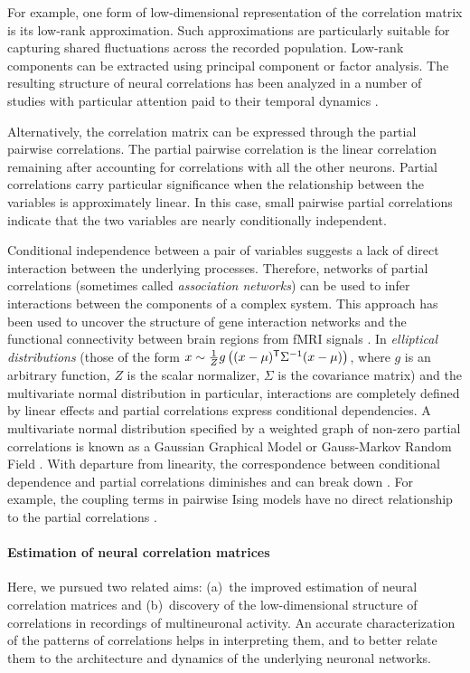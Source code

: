 \documentclass[10pt]{article}
\newcommand{\T}{{\sf T}}
\begin{document}
For example, one form of low-dimensional representation of the correlation matrix is its low-rank approximation. Such approximations are particularly suitable for capturing shared fluctuations across the recorded population. Low-rank components can be extracted using principal component or factor analysis. The resulting structure of  neural correlations has been analyzed in a number of studies with particular attention paid to their temporal dynamics \cite{Yu:2009}.

Alternatively, the correlation matrix can be expressed through the partial pairwise correlations. The partial pairwise correlation is the linear correlation remaining after accounting for correlations with all the other neurons. Partial correlations carry particular significance when the relationship between the variables is approximately linear. In this case, small pairwise partial correlations indicate that the two variables are nearly conditionally independent.  

Conditional independence between a pair of variables suggests a lack of direct interaction between the underlying processes. Therefore, networks of partial correlations (sometimes called \emph{association networks}) can be used to infer interactions between the components of a complex system.  This approach has been used to uncover the structure of gene interaction networks \cite{Schafer:2005,Peng:2009} and the functional connectivity between brain regions from fMRI signals \cite{Varoquaux:2012,Ryali:2012}. In \emph{elliptical distributions} (those of the form $x \sim \frac 1 Z g\left((x-\mu)^\T\Sigma^{-1}(x-\mu)\right)$, where $g$ is an arbitrary function, $Z$ is the scalar normalizer, $\Sigma$ is the covariance matrix) and the multivariate normal distribution in particular, interactions are completely defined by linear effects and partial correlations express conditional dependencies. A multivariate normal distribution specified by a weighted graph of non-zero partial correlations is known as a Gaussian Graphical Model or Gauss-Markov Random Field \cite{Koller:2009}. With departure from linearity, the correspondence between conditional dependence and partial correlations diminishes and can break down \cite{Loh:2012}. For example, the coupling terms in pairwise Ising models have no direct relationship to the partial correlations \cite{Schneidman:2006, Tkacik:2006}.


\paragraph{Estimation of neural correlation matrices}
Here, we pursued two related aims: (a)~the improved estimation of neural correlation matrices and (b)~discovery of the low-dimensional structure of correlations in recordings of multineuronal activity. An accurate characterization of the patterns of correlations helps in interpreting them, and to better relate them to the architecture and dynamics of the underlying neuronal networks.   
\end{document}
